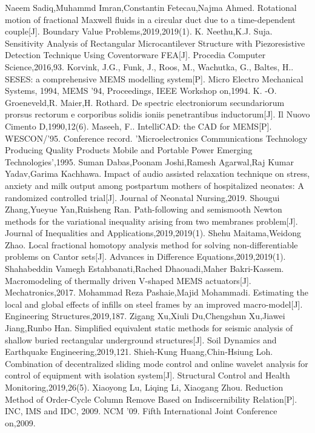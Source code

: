 \documentclass[no-math]{YangThesis}
\begin{document}
\begin{thebibliography}{9}
  Naeem Sadiq,Muhammd Imran,Constantin Fetecau,Najma Ahmed. Rotational motion of fractional Maxwell fluids in a circular duct due to a time-dependent couple[J]. Boundary Value Problems,2019,2019(1).
 K. Neethu,K.J. Suja. Sensitivity Analysis of Rectangular Microcantilever Structure with Piezoresistive Detection Technique Using Coventorware FEA[J]. Procedia Computer Science,2016,93.
  Korvink, J.G., Funk, J., Roos, M., Wachutka, G., Baltes, H.. SESES: a comprehensive MEMS modelling system[P]. Micro Electro Mechanical Systems, 1994, MEMS '94, Proceedings, IEEE Workshop on,1994.
  K. -O. Groeneveld,R. Maier,H. Rothard. De spectric electroniorum secundariorum prorsus rectorum e corporibus solidis ioniis penetrantibus inductorum[J]. Il Nuovo Cimento D,1990,12(6).
 Maseeh, F.. IntelliCAD: the CAD for MEMS[P]. WESCON/'95. Conference record. 'Microelectronics Communications Technology Producing Quality Products Mobile and Portable Power Emerging Technologies',1995.
  Suman Dabas,Poonam Joshi,Ramesh Agarwal,Raj Kumar Yadav,Garima Kachhawa. Impact of audio assisted relaxation technique on stress, anxiety and milk output among postpartum mothers of hospitalized neonates: A randomized controlled trial[J]. Journal of Neonatal Nursing,2019.
  Shougui Zhang,Yueyue Yan,Ruisheng Ran. Path-following and semismooth Newton methods for the variational inequality arising from two membranes problem[J]. Journal of Inequalities and Applications,2019,2019(1).
  Shehu Maitama,Weidong Zhao. Local fractional homotopy analysis method for solving non-differentiable problems on Cantor sets[J]. Advances in Difference Equations,2019,2019(1).
  Shahabeddin Vamegh Estahbanati,Rached Dhaouadi,Maher Bakri-Kassem. Macromodeling of thermally driven V-shaped MEMS actuators[J]. Mechatronics,2017.
  Mohammad Reza Pashaie,Majid Mohammadi. Estimating the local and global effects of infills on steel frames by an improved macro-model[J]. Engineering Structures,2019,187.
  Zigang Xu,Xiuli Du,Chengshun Xu,Jiawei Jiang,Runbo Han. Simplified equivalent static methods for seismic analysis of shallow buried rectangular underground structures[J]. Soil Dynamics and Earthquake Engineering,2019,121.
  Shieh‐Kung Huang,Chin‐Hsiung Loh. Combination of decentralized sliding mode control and online wavelet analysis for control of equipment with isolation system[J]. Structural Control and Health Monitoring,2019,26(5).
  Xiaoyong Lu, Liqing Li, Xiaogang Zhou. Reduction Method of Order-Cycle Column Remove Based on Indiscernibility Relation[P]. INC, IMS and IDC, 2009. NCM '09. Fifth International Joint Conference on,2009.

\end{thebibliography}
\end{document}
